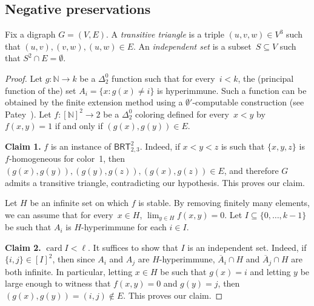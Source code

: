 \documentclass{article}
\newcommand{\BRT}[0]{\mathsf{BRT}}
\newcommand{\NN}[0]{\mathbb{N}}
\newcommand{\card}{\operatorname{card}}
\numberwithin{theorem}{section}
\newtheorem{proposition}[theorem]{Proposition}
\begin{document}
\subsection{Negative preservations}

Fix a digraph $G = (V,E)$. A \emph{transitive triangle} is a triple $(u, v, w) \in V^3$ such that $(u, v), (v, w), (u, w) \in E$. An \emph{independent set} is a subset~$S \subseteq V$ such that $S^2 \cap E = \emptyset$.


\begin{proof}
Let $g : \NN \to k$ be a $\Delta^0_2$ function such that for every~$i < k$, the (principal function of the) set $A_i = \{ x : g(x) \neq i \}$ is hyperimmune. Such a function can be obtained by the finite extension method using a $\emptyset'$-computable construction (see Patey~\cite[Theorem 8.2.1]{patey2016reverse}).
Let $f : [\NN]^2 \to 2$ be a $\Delta^0_2$ coloring defined for every~$x < y$ by $f(x, y) = 1$ if and only if $(g(x), g(y)) \in E$.

\bigskip

\noindent
\textbf{Claim 1.} $f$ is an instance of $\BRT^2_{2,3}$.
Indeed, if $x < y < z$ is such that $\{ x, y, z\}$ is $f$-homogeneous for color~1, then $(g(x), g(y)), (g(y), g(z)), (g(x), g(z)) \in E$, and therefore $G$ admits a transitive triangle, contradicting our hypothesis. This proves our claim.
\bigskip

Let $H$ be an infinite set on which $f$ is stable. By removing finitely many elements, we can assume that for every~$x \in H$, $\lim_{y \in H} f(x, y) = 0$.
Let $I \subseteq \{0, \dots, k-1\}$ be such that $A_i$ is $H$-hyperimmune for each $i \in I$.

\bigskip

\noindent
\textbf{Claim 2.} $\card I < \ell$.
It suffices to show that $I$ is an independent set. Indeed, if $\{i,j\} \in [I]^2$, then since $A_i$ and $A_j$ are $H$-hyperimmune, $\overline{A}_i \cap H$ and $\overline{A}_j \cap H$ are both infinite. In particular, letting $x \in H$ be such that $g(x) = i$ and letting $y$ be large enough to witness that $f(x, y) = 0$ and $g(y) = j$, then $(g(x), g(y)) = (i, j) \not \in E$. This proves our claim.
\end{proof}
\end{document}

